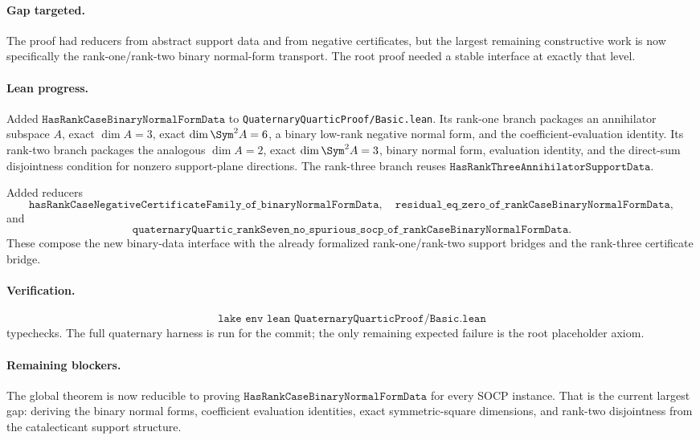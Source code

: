 \documentclass[11pt]{article}
\begin{document}
\paragraph{Gap targeted.}
The proof had reducers from abstract support data and from negative
certificates, but the largest remaining constructive work is now specifically
the rank-one/rank-two binary normal-form transport.  The root proof needed a
stable interface at exactly that level.

\paragraph{Lean progress.}
Added \(\texttt{HasRankCaseBinaryNormalFormData}\) to
\texttt{QuaternaryQuarticProof/Basic.lean}.  Its rank-one branch packages an
annihilator subspace \(A\), exact \(\dim A=3\), exact \(\dim\Sym^2A=6\), a
binary low-rank negative normal form, and the coefficient-evaluation identity.
Its rank-two branch packages the analogous \(\dim A=2\), exact
\(\dim\Sym^2A=3\), binary normal form, evaluation identity, and the direct-sum
disjointness condition for nonzero support-plane directions.  The rank-three
branch reuses \(\texttt{HasRankThreeAnnihilatorSupportData}\).

Added reducers
\[
\texttt{hasRankCaseNegativeCertificateFamily\_of\_binaryNormalFormData},
\quad
\texttt{residual\_eq\_zero\_of\_rankCaseBinaryNormalFormData},
\]
and
\[
\texttt{quaternaryQuartic\_rankSeven\_no\_spurious\_socp\_of\_rankCaseBinaryNormalFormData}.
\]
These compose the new binary-data interface with the already formalized
rank-one/rank-two support bridges and the rank-three certificate bridge.

\paragraph{Verification.}
\[
\texttt{lake env lean QuaternaryQuarticProof/Basic.lean}
\]
typechecks.  The full quaternary harness is run for the commit; the only
remaining expected failure is the root placeholder axiom.

\paragraph{Remaining blockers.}
The global theorem is now reducible to proving
\(\texttt{HasRankCaseBinaryNormalFormData}\) for every SOCP instance.  That is
the current largest gap: deriving the binary normal forms, coefficient
evaluation identities, exact symmetric-square dimensions, and rank-two
disjointness from the catalecticant support structure.
\end{document}

